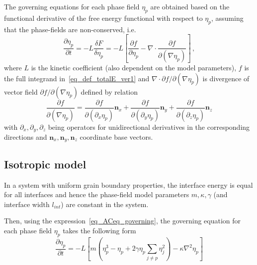The governing equations for each phase field $\eta_p$ are obtained based on the  functional derivative of the free energy functional with respect to $\eta_p$, assuming that the phase-fields are non-conserved, i.e. %
\begin{equation}
	\label{eq_ACeq_governing}
	\frac{\partial \eta_p}{\partial t} = -L\frac{\delta F}{\delta \eta_p} = -L \left[ \frac{\partial f}{\partial \eta_p} - \nabla\cdot\frac{\partial f}{\partial(\nabla \eta_p)} \right] \,,
\end{equation}
where $L$ is the kinetic coefficient (also dependent on the model parameters), $f$ is the full integrand in~\eqref{eq_def_totalE_ver1} and $\nabla\cdot\partial f/\partial(\nabla \eta_p)$ is divergence of vector field $\partial f/\partial(\nabla \eta_p)$ defined by relation
\begin{equation}
	\frac{\partial f}{\partial(\nabla \eta_p)} = \frac{\partial f}{\partial(\partial_x\eta_p)}\mathbf{n}_x + \frac{\partial f}{\partial(\partial_y \eta_p)}\mathbf{n}_y + \frac{\partial f}{\partial(\partial_z \eta_p)}\mathbf{n}_z
\end{equation}
with $\partial_x,\partial_y,\partial_z$ being operators for unidirectional derivatives in the corresponding directions and $\mathbf{n}_x,\mathbf{n}_y,\mathbf{n}_z$ coordinate base vectors. 

	\subsection{Isotropic model}
	\label{sec_Models}
	In a system with uniform grain boundary properties, the interface energy is equal for all interfaces and hence the phase-field model parameters $m,\kappa, \gamma$ (and interface width $l_{int}$) are constant in the system.
	
	Then, using the expression~\eqref{eq_ACeq_governing}, the governing equation for each phase field $\eta_p$ takes the following form %
	\begin{equation}
		\frac{\partial \eta_p}{\partial t} = -L\left[ m\left( \eta_p^3-\eta_p +  2\gamma\eta_p\sum_{j\neq p}\eta_j^2 \right) - \kappa\nabla^2\eta_p \right] 
	\end{equation}
	
